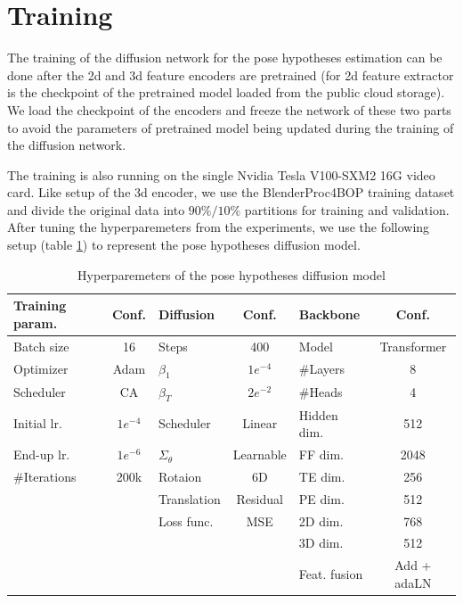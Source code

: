 \documentclass[12pt,DIV14,BCOR12mm,a4paper,footinclude=false,headinclude,parskip=half-,twoside,openright,cleardoublepage=empty,toc=index,bibliography=totoc,listof=totoc]{scrreprt}
\numberwithin{equation}{chapter}
\begin{document}
\section{Training} 
The training of the diffusion network for the pose hypotheses estimation can be done after the \gls{2d} and \gls{3d} feature encoders are pretrained (for \gls{2d} feature extractor is the checkpoint of the pretrained model loaded from the public cloud storage). We load the checkpoint of the encoders and freeze the network of these two parts to avoid the parameters of pretrained model being updated during the training of the diffusion network. 

The training is also running on the single Nvidia Tesla V100-SXM2 16G video card. Like setup of the \gls{3d} encoder, we use the BlenderProc4BOP training dataset and divide the original data into $90\%/10\%$ partitions for training and validation. After tuning the hyperparemeters from the experiments, we use the following setup (table \ref{tab:hyper}) to represent the pose hypotheses diffusion model.
\begin{table}[h]
  \centering
  \caption{Hyperparemeters of the pose hypotheses diffusion model}
  \label{tab:hyper}
  \begin{tabular}{l c | l c | l c}
      \toprule
      Training param. & Conf. & Diffusion & Conf. & Backbone & Conf.\\
      \midrule
      Batch size & 16 & Steps & 400 & Model & Transformer\\
      Optimizer & Adam & $\beta_{1}$ & $1e^{-4}$ & \#Layers & 8\\
      Scheduler & CA & $\beta_{T}$ & $2e^{-2}$ & \#Heads & 4\\
      Initial lr. & $1e^{-4}$ & Scheduler & Linear & Hidden dim. & 512\\
      End-up lr. & $1e^{-6}$ & $\Sigma_{\theta}$ & Learnable & FF dim. & 2048\\
      \#Iterations & 200k & Rotaion & 6D & TE dim. & 256\\
       &  & Translation & Residual & PE dim. & 512\\
       &  & Loss func. & MSE & 2D dim. & 768\\
       &  & & & 3D dim. & 512\\
       &  & & & Feat. fusion & Add + adaLN\\
      \bottomrule
  \end{tabular}
\end{table}
\end{document}
